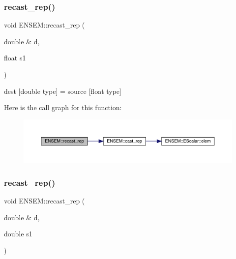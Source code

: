 \subsubsection{\texorpdfstring{recast\_rep()}{recast\_rep()}\hspace{0.1cm}{\footnotesize\ttfamily [5/6]}}
{\footnotesize\ttfamily void E\+N\+S\+E\+M\+::recast\+\_\+rep (\begin{DoxyParamCaption}\item[{double \&}]{d,  }\item[{float}]{s1 }\end{DoxyParamCaption})\hspace{0.3cm}{\ttfamily [inline]}}



dest \mbox{[}double type\mbox{]} = source \mbox{[}float type\mbox{]} 

Here is the call graph for this function\+:\nopagebreak
\begin{figure}[H]
\begin{center}
\leavevmode
\includegraphics[width=350pt]{dd/d99/group__simpleword_ga78492af33f3095694863918e99ec9d6a_cgraph}
\end{center}
\end{figure}
\mbox{\label{group__simpleword_ga9c4fac4c3903b043a9a31c9036f875f7}} 
\subsubsection{\texorpdfstring{recast\_rep()}{recast\_rep()}\hspace{0.1cm}{\footnotesize\ttfamily [6/6]}}
{\footnotesize\ttfamily void E\+N\+S\+E\+M\+::recast\+\_\+rep (\begin{DoxyParamCaption}\item[{double \&}]{d,  }\item[{double}]{s1 }\end{DoxyParamCaption})\hspace{0.3cm}{\ttfamily [inline]}}



